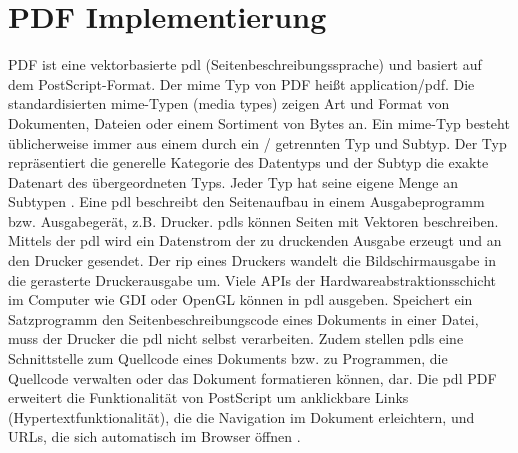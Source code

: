 \section{PDF Implementierung}
PDF ist eine vektorbasierte \gls{pdl} (Seitenbeschreibungssprache) und basiert auf dem PostScript-Format. Der \gls{mime} Typ von PDF heißt application/pdf. Die standardisierten \gls{mime}-Typen (media types) zeigen Art und Format von Dokumenten, Dateien oder einem Sortiment von Bytes an. Ein \gls{mime}-Typ besteht üblicherweise immer aus einem durch ein / getrennten Typ und Subtyp. Der Typ repräsentiert die generelle Kategorie des Datentyps und der Subtyp die exakte Datenart des übergeordneten Typs. Jeder Typ hat seine eigene Menge an Subtypen \cite{mime}. Eine \gls{pdl} beschreibt den Seitenaufbau in einem Ausgabeprogramm bzw. Ausgabegerät, z.B. Drucker. \gls{pdl}s können Seiten mit Vektoren beschreiben. Mittels der \gls{pdl} wird ein Datenstrom der zu druckenden Ausgabe erzeugt und an den Drucker gesendet. Der \gls{rip} eines Druckers wandelt die Bildschirmausgabe in die gerasterte Druckerausgabe um. Viele APIs der Hardwareabstraktionsschicht im Computer wie GDI oder OpenGL können in \gls{pdl} ausgeben. Speichert ein Satzprogramm den Seitenbeschreibungscode eines Dokuments in einer Datei, muss der Drucker die \gls{pdl} nicht selbst verarbeiten. Zudem stellen \gls{pdl}s eine Schnittstelle zum Quellcode eines Dokuments bzw. zu Programmen, die Quellcode verwalten oder das Dokument formatieren können, dar. Die \gls{pdl} PDF erweitert die Funktionalität von PostScript um anklickbare Links (Hypertextfunktionalität), die die Navigation im Dokument erleichtern, und URLs, die sich automatisch im Browser öffnen \cite{wiki-pdl}.

